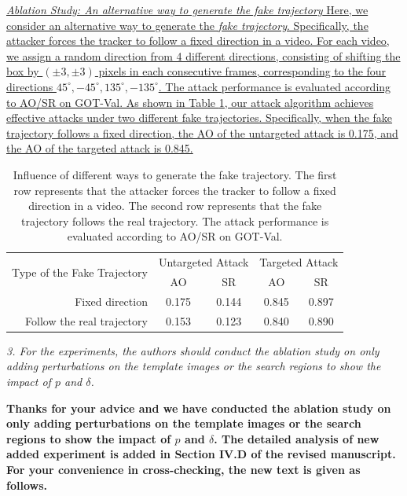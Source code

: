 \documentclass[12pt]{article}
\begin{document}
\uline{
\textit{Ablation Study: An alternative way to generate the fake trajectory}  Here, we consider an alternative way to generate the \textit{fake trajectory}. Specifically, the attacker forces the tracker to follow a fixed direction in a video. For each video, we assign a random direction from 4 different directions, consisting of shifting the box by $(\pm 3, \pm 3)$ pixels in each consecutive frames, corresponding to the four directions $45^{\circ}, -45^{\circ}, 135^{\circ}, -135^{\circ}$.
The attack performance is evaluated according to AO/SR on GOT-Val.
As shown in Table \ref{table:direction}, our attack algorithm achieves effective attacks under two different fake trajectories. Specifically, when the fake trajectory follows a fixed direction, the AO of the untargeted attack is 0.175, and the AO of the targeted attack is 0.845.
}

\begin{table}[t]
  \renewcommand\thetable{X}
  \centering
  \caption{Influence of different ways to generate the fake trajectory.
  The first row represents that the attacker forces the tracker to follow a fixed direction in a video.
  The second row represents that the fake trajectory follows the real trajectory. The attack performance is evaluated according to AO/SR on GOT-Val.}
  \begin{tabular}{@{}rcccc@{}}
  \toprule
  \multirow{2}{*}[-2pt]{Type of the Fake Trajectory} & \multicolumn{2}{c}{Untargeted Attack} & \multicolumn{2}{c}{Targeted Attack} \\ \cmidrule{2-5}
                              & AO                & SR                & AO               & SR               \\ \midrule
  Fixed direction             & 0.175             & 0.144             & 0.845            & 0.897            \\
  Follow the real trajectory      & 0.153             & 0.123             & 0.840            & 0.890            \\ \bottomrule        
  \end{tabular}
  \label{table:direction}
\end{table}

\textit{3. For the experiments, the authors should conduct the ablation study on only adding perturbations on the template images or the search regions to show the impact of $p$ and $\delta$.}

\textbf{Thanks for your advice and we have conducted the ablation study on only adding perturbations on the template images or the search regions to show the impact of $p$ and $\delta$.
The detailed analysis of new added experiment is added in Section IV.D of the revised manuscript. For your convenience in cross-checking, the new text is given as follows.}
\end{document}
